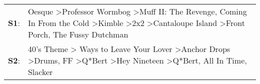 \begin{supertabular}{p{0.03\textwidth}p{0.92\textwidth}}
 \textbf{S1}:  &        Oesque\textsuperscript{} \textgreater \enspace Professor Wormbog\textsuperscript{} \textgreater \enspace Muff II: The Revenge\textsuperscript{}, \enspace Coming In From the Cold\textsuperscript{} \textgreater \enspace Kimble\textsuperscript{} \textgreater \enspace 2x2\textsuperscript{} \textgreater \enspace Cantaloupe Island\textsuperscript{} \textgreater \enspace Front Porch\textsuperscript{}, \enspace The Fussy Dutchman\textsuperscript{}  \enspace  \\
 \textbf{S2}:  &  40's Theme\textsuperscript{} \textgreater {} Ways to Leave Your Lover\textsuperscript{} \textgreater \enspace Anchor Drops\textsuperscript{} \textgreater \enspace Drums\textsuperscript{}, \enspace FF\textsuperscript{} \textgreater \enspace Q*Bert\textsuperscript{} \textgreater \enspace Hey Nineteen\textsuperscript{} \textgreater \enspace Q*Bert\textsuperscript{}, \enspace All In Time\textsuperscript{}, \enspace Slacker\textsuperscript{}  \enspace  \\
\end{supertabular}
